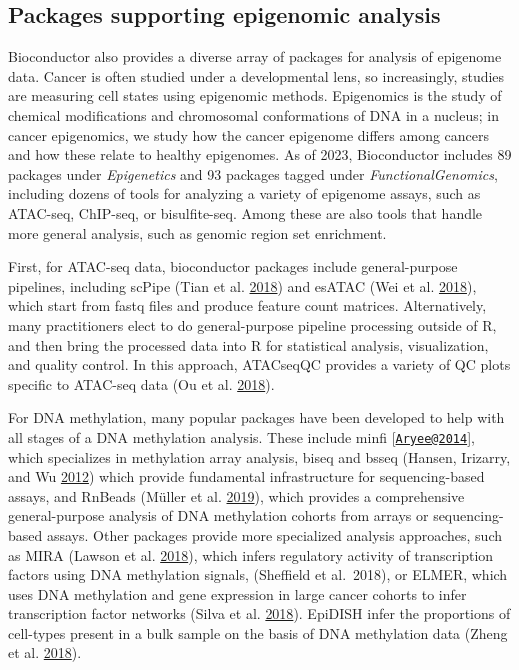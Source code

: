 \documentclass[]{article}
\begin{document}
\hypertarget{packages-supporting-epigenomic-analysis}{%
\subsection{Packages supporting epigenomic analysis}\label{packages-supporting-epigenomic-analysis}}

Bioconductor also provides a diverse array of packages for analysis of epigenome
data. Cancer is often studied under a developmental lens, so increasingly, studies
are measuring cell states using epigenomic methods. Epigenomics is the study of
chemical modifications and chromosomal conformations of DNA in a nucleus; in cancer
epigenomics, we study how the cancer epigenome differs among cancers and how
these relate to healthy epigenomes. As of 2023, Bioconductor includes 89 packages
under \emph{Epigenetics} and 93 packages tagged under \emph{FunctionalGenomics}, including dozens of tools
for analyzing a variety of epigenome assays, such as ATAC-seq, ChIP-seq, or
bisulfite-seq. Among these are also tools that handle more general analysis, such
as genomic region set enrichment.

First, for ATAC-seq data, bioconductor packages include general-purpose pipelines, including scPipe
(Tian et al. \protect\hyperlink{ref-Tian2018}{2018})
and esATAC (Wei et al. \protect\hyperlink{ref-Wei2018}{2018}), which start from fastq files and produce feature count
matrices. Alternatively, many practitioners elect to do general-purpose pipeline processing outside of
R, and then bring the processed data into R for statistical analysis,
visualization, and quality control. In this approach, ATACseqQC
provides
a variety of QC plots specific to ATAC-seq data (Ou et al. \protect\hyperlink{ref-Ou2018}{2018}).

For DNA methylation, many popular packages have been developed to help with
all stages of a DNA methylation analysis. These include minfi {[}\href{mailto:Aryee@2014}{\nolinkurl{Aryee@2014}}{]},
which specializes in methylation array analysis, biseq and bsseq (Hansen, Irizarry, and Wu \protect\hyperlink{ref-Hansen2012}{2012})
which provide fundamental infrastructure for sequencing-based assays, and RnBeads
(Müller et al. \protect\hyperlink{ref-Mueller2019}{2019}), which provides a comprehensive general-purpose analysis of DNA
methylation cohorts from arrays or sequencing-based assays. Other packages provide more specialized
analysis approaches, such as MIRA (Lawson et al. \protect\hyperlink{ref-Lawson2018}{2018}), which infers regulatory
activity of transcription factors using DNA methylation signals, (Sheffield et al.~2018),
or ELMER, which uses DNA methylation and gene expression in large cancer
cohorts to infer transcription factor networks (Silva et al. \protect\hyperlink{ref-Silva2019}{2018}). EpiDISH infer
the proportions of cell-types present in a bulk sample on the basis
of DNA methylation data (Zheng et al. \protect\hyperlink{ref-Zheng2018a}{2018}).
\end{document}
